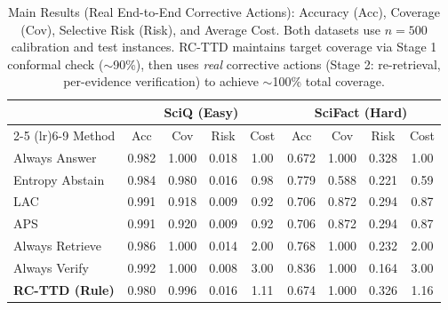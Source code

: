 \begin{table}[t]
\centering
\small
\caption{Main Results (Real End-to-End Corrective Actions): Accuracy (Acc), Coverage (Cov), Selective Risk (Risk), and Average Cost. Both datasets use $n{=}500$ calibration and test instances. RC-TTD maintains target coverage via Stage 1 conformal check ($\sim$90\%), then uses \emph{real} corrective actions (Stage 2: re-retrieval, per-evidence verification) to achieve $\sim$100\% total coverage.}
\label{tab:main}
\begin{tabular}{lcccc cccc}
\toprule
& \multicolumn{4}{c}{\textbf{SciQ (Easy)}} & \multicolumn{4}{c}{\textbf{SciFact (Hard)}} \\
\cmidrule(lr){2-5} \cmidrule(lr){6-9}
Method & Acc & Cov & Risk & Cost & Acc & Cov & Risk & Cost \\
\midrule
Always Answer & 0.982 & 1.000 & 0.018 & 1.00 & 0.672 & 1.000 & 0.328 & 1.00 \\
Entropy Abstain & 0.984 & 0.980 & 0.016 & 0.98 & 0.779 & 0.588 & 0.221 & 0.59 \\
\midrule
LAC & 0.991 & 0.918 & 0.009 & 0.92 & 0.706 & 0.872 & 0.294 & 0.87 \\
APS & 0.991 & 0.920 & 0.009 & 0.92 & 0.706 & 0.872 & 0.294 & 0.87 \\
\midrule
Always Retrieve & 0.986 & 1.000 & 0.014 & 2.00 & 0.768 & 1.000 & 0.232 & 2.00 \\
Always Verify & 0.992 & 1.000 & 0.008 & 3.00 & 0.836 & 1.000 & 0.164 & 3.00 \\
\midrule
\textbf{RC-TTD (Rule)} & 0.980 & 0.996 & 0.016 & 1.11 & 0.674 & 1.000 & 0.326 & 1.16 \\
\bottomrule
\end{tabular}
\end{table}
